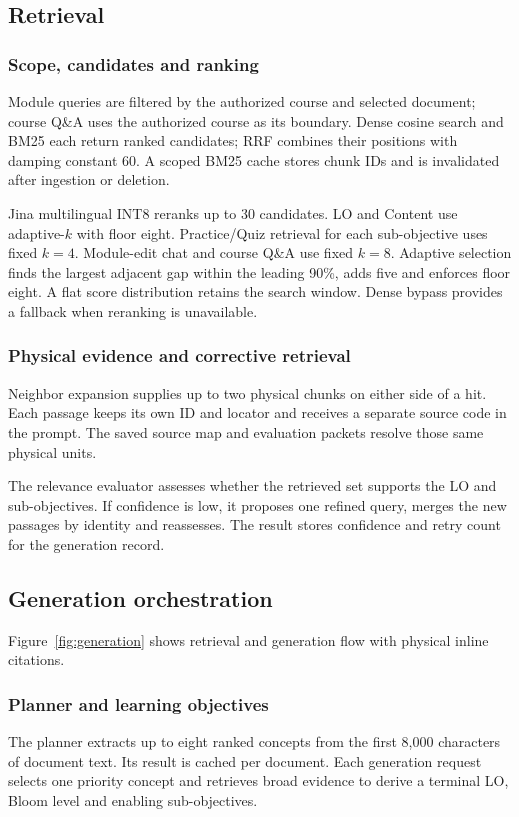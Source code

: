 \subsection{Retrieval}
\subsubsection{Scope, candidates and ranking}\label{sec:retrieval-policy}
Module queries are filtered by the authorized course and selected document; course Q\&A uses the authorized course as its boundary. Dense cosine search and BM25 each return ranked candidates; RRF combines their positions with damping constant 60\citep{bm25,rrf}. A scoped BM25 cache stores chunk IDs and is invalidated after ingestion or deletion.

Jina multilingual INT8 reranks up to 30 candidates. LO and Content use adaptive-$k$ with floor eight. Practice/Quiz retrieval for each sub-objective uses fixed $k=4$. Module-edit chat and course Q\&A use fixed $k=8$. Adaptive selection finds the largest adjacent gap within the leading 90\%, adds five and enforces floor eight\citep{adaptive}. A flat score distribution retains the search window. Dense bypass provides a fallback when reranking is unavailable.
\subsubsection{Physical evidence and corrective retrieval}
Neighbor expansion supplies up to two physical chunks on either side of a hit. Each passage keeps its own ID and locator and receives a separate source code in the prompt. The saved source map and evaluation packets resolve those same physical units.

The relevance evaluator assesses whether the retrieved set supports the LO and sub-objectives. If confidence is low, it proposes one refined query, merges the new passages by identity and reassesses\citep{correctiverag}. The result stores confidence and retry count for the generation record.
\subsection{Generation orchestration}\label{sec:generation}
Figure~\ref{fig:generation} shows retrieval and generation flow with physical inline citations.
\subsubsection{Planner and learning objectives}
The planner extracts up to eight ranked concepts from the first 8,000 characters of document text. Its result is cached per document. Each generation request selects one priority concept and retrieves broad evidence to derive a terminal LO, Bloom level and enabling sub-objectives.

